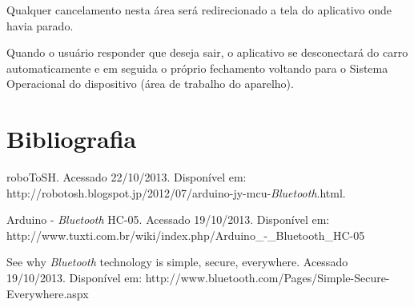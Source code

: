 \documentclass[portugues, brazil, a4paper,12pt]{article}
\begin{document}
Qualquer cancelamento nesta área será redirecionado a tela do aplicativo onde havia parado.

Quando o usuário responder que deseja sair, o aplicativo se desconectará do carro automaticamente e em seguida o próprio fechamento voltando para o Sistema Operacional do dispositivo (área de trabalho do aparelho).

\newpage
\section{Bibliografia}
\begin{thebibliography}{100} %

 roboToSH. Acessado 22/10/2013. Disponível em: http://robotosh.blogspot.jp/2012/07/arduino-jy-mcu-\textit{Bluetooth}.html.

 Arduino - \textit{Bluetooth} HC-05. Acessado 19/10/2013. Disponível em: http://www.tuxti.com.br/wiki/index.php/Arduino\_-\_Bluetooth\_HC-05

 See why \textit{Bluetooth} technology is simple, secure, everywhere. Acessado 19/10/2013. Disponível em: http://www.bluetooth.com/Pages/Simple-Secure-Everywhere.aspx
\end{thebibliography}
\end{document}
